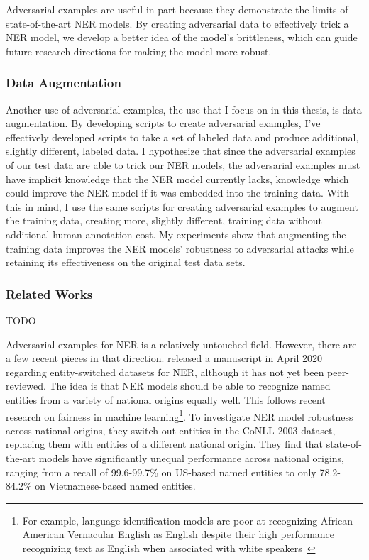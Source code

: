 Adversarial examples are useful in part because they demonstrate the limits of state-of-the-art NER models. By creating adversarial data to effectively trick a NER model, we develop a better idea of the model's brittleness, which can guide future research directions for making the model more robust.

\subsubsection{Data Augmentation}
Another use of adversarial examples, the use that I focus on in this thesis, is data augmentation. By developing scripts to create adversarial examples, I've effectively developed scripts to take a set of labeled data and produce additional, slightly different, labeled data. I hypothesize that since the adversarial examples of our test data are able to trick our NER models, the adversarial examples must have implicit knowledge that the NER model currently lacks, knowledge which could improve the NER model if it was embedded into the training data. With this in mind, I use the same scripts for creating adversarial examples to augment the training data, creating more, slightly different, training data without additional human annotation cost. My experiments show that augmenting the training data improves the NER models' robustness to adversarial attacks while retaining its effectiveness on the original test data sets. 


\subsubsection{Related Works}
TODO


Adversarial examples for NER is a relatively untouched field. However, there are a few recent pieces in that direction. \cite{entityswitched} released a manuscript in April 2020 regarding entity-switched datasets for NER, although it has not yet been peer-reviewed. The idea is that NER models should be able to recognize named entities from a variety of national origins equally well. This follows recent research on fairness in machine learning\footnote{For example, language identification models are poor at recognizing African-American Vernacular English as English despite their high performance recognizing text as English when associated with white speakers~\citep{blodgett2016}}. To investigate NER model robustness across national origins, they switch out entities in the CoNLL-2003 dataset, replacing them with entities of a different national origin. They find that state-of-the-art models have significantly unequal performance across national origins, ranging from a recall of 99.6-99.7\% on US-based named entities to only 78.2-84.2\% on Vietnamese-based named entities. 

